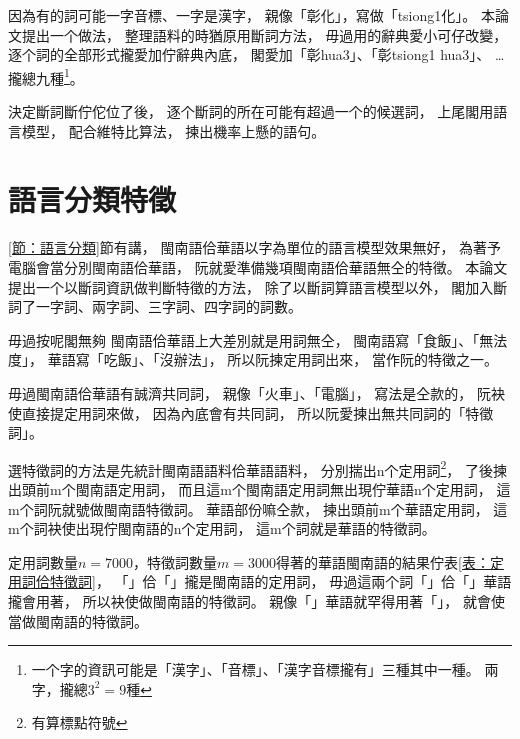 因為有的詞可能一字音標、一字是漢字，
親像「彰化」，寫做「tsiong1化」。
本論文提出一个做法，
整理語料的時猶原用斷詞方法，
毋過用的辭典愛小可仔改變，
逐个詞的全部形式攏愛加佇辭典內底，
閣愛加「彰hua3」、「彰tsiong1 hua3」、
…攏總九種\footnote{一个字的資訊可能是「漢字」、「音標」、「漢字音標攏有」三種其中一種。
兩字，攏總$3^{2}=9$種}。


決定斷詞斷佇佗位了後，
逐个斷詞的所在可能有超過一个的候選詞，
上尾閣用語言模型，
配合維特比算法，
揀出機率上懸的語句。


\section{語言分類特徵}
\label{節：語言分類特徵}

\ref{節：語言分類}節有講，
閩南語佮華語以字為單位的語言模型效果無好，
為著予電腦會當分別閩南語佮華語，
阮就愛準備幾項閩南語佮華語無仝的特徵。
本論文提出一个以斷詞資訊做判斷特徵的方法，
除了以斷詞算語言模型以外，
閣加入斷詞了一字詞、兩字詞、三字詞、四字詞的詞數。

毋過按呢閣無夠
閩南語佮華語上大差別就是用詞無仝，
閩南語寫「食飯」、「無法度」，
華語寫「吃飯」、「沒辦法」，
所以阮揀定用詞出來，
當作阮的特徵之一。

毋過閩南語佮華語有誠濟共同詞，
親像「火車」、「電腦」，
寫法是仝款的，
阮袂使直接提定用詞來做，
因為內底會有共同詞，
所以阮愛揀出無共同詞的「特徵詞」。

選特徵詞的方法是先統計閩南語語料佮華語語料，
分別揣出n个定用詞\footnote{有算標點符號}，
了後揀出頭前m个閩南語定用詞，
而且這m个閩南語定用詞無出現佇華語n个定用詞，
這m个詞阮就號做閩南語特徵詞。
華語部份嘛仝款，
揀出頭前m个華語定用詞，
這m个詞袂使出現佇閩南語的n个定用詞，
這m个詞就是華語的特徵詞。

$定用詞數量n=7000，特徵詞數量m=3000$得著的華語閩南語的結果佇表\ref{表：定用詞佮特徵詞}，
「」佮「」攏是閩南語的定用詞，
毋過這兩个詞「」佮「」華語攏會用著，
所以袂使做閩南語的特徵詞。
親像「」華語就罕得用著「」，
就會使當做閩南語的特徵詞。

